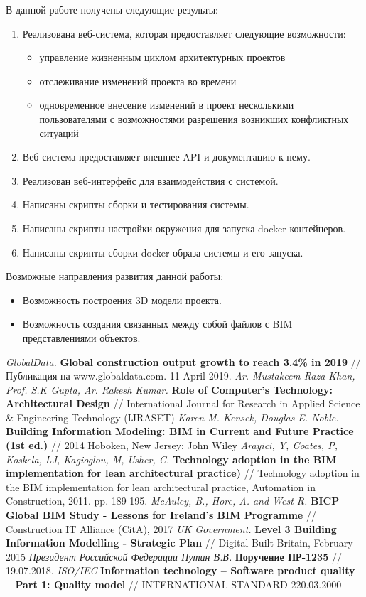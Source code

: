 \documentclass[a4paper,14pt]{extreport} %
\begin{document}
В данной работе получены следующие результы:
\begin{enumerate}
\item Реализована  веб-система, которая предоставляет следующие возможности:
\begin{itemize}
\item управление жизненным циклом архитектурных проектов
\item отслеживание изменений проекта во времени
\item одновременное внесение изменений в проект несколькими пользователями с возможностями разрешения возникших конфликтных ситуаций
\end{itemize}
\item Веб-система предоставляет внешнее API и документацию к нему.
\item Реализован веб-интерфейс для взаимодействия с системой.
\item Написаны скрипты сборки и тестирования системы.
\item Написаны скрипты настройки окружения для запуска docker-контейнеров.
\item Написаны скрипты сборки docker-образа системы и его запуска.
\end{enumerate}

Возможные направления развития данной работы:
\begin{itemize}
\item Возможность построения 3D модели проекта.
\item Возможность создания связанных между собой файлов с BIM представлениями объектов.
\end{itemize}

\begin{thebibliography}{1}
{\small
{} {\it GlobalData.}
\textbf{Global construction output growth to reach 3.4\% in 2019} // Публикация на www.globaldata.com. 11 April 2019.
 \textit{Ar. Mustakeem Raza Khan, Prof. S.K Gupta, Ar. Rakesh Kumar.}
\textbf{Role of Computer’s Technology: Architectural Design} // International Journal for Research in Applied Science \& Engineering Technology (IJRASET)
 {\it Karen M. Kensek, Douglas E. Noble.}
\textbf{Building Information Modeling: BIM in Current and Future Practice (1st ed.)} // 2014 Hoboken, New Jersey: John Wiley
 {\it Arayici, Y, Coates, P, Koskela, LJ, Kagioglou, M, Usher, C.}
\textbf{Technology adoption in the BIM implementation for lean architectural practice)} // Technology adoption in the BIM implementation for lean architectural practice, Automation in Construction, 2011. pp. 189-195.
 {\it McAuley, B., Hore, A. and West R.}
\textbf{BICP Global BIM Study - Lessons for Ireland’s BIM Programme} // Construction IT Alliance (CitA), 2017
 {\it UK Government.}
\textbf{Level 3 Building Information Modelling - Strategic Plan} // Digital Built Britain, February 2015
 {\it Президент Российской Федерации Путин В.В.}
\textbf{Поручение ПР-1235} // 19.07.2018.
 {\it ISO/IEC}
\textbf{Information technology -- Software product quality -- Part 1: Quality model} // INTERNATIONAL STANDARD 220.03.2000
}
\end{thebibliography}
\end{document}
